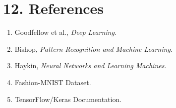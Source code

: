 \documentclass[11pt]{article}
\begin{document}
\section*{12. References}
\begin{enumerate}
\item Goodfellow et al., \emph{Deep Learning}.
\item Bishop, \emph{Pattern Recognition and Machine Learning}.
\item Haykin, \emph{Neural Networks and Learning Machines}.
\item Fashion-MNIST Dataset.
\item TensorFlow/Keras Documentation.
\end{enumerate}
\end{document}
